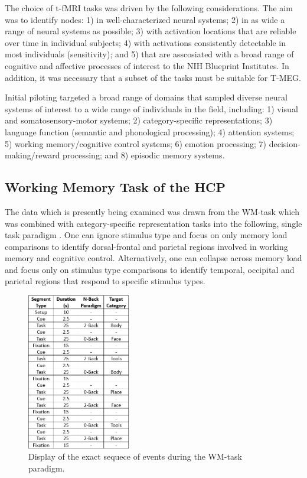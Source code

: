 The choice of \gls{t-fMRI} tasks was driven by the following considerations. The aim was to identify nodes: 1) in well-characterized neural systems; 2) in as wide a range of neural systems as possible; 3) with activation locations that are reliable over time in individual subjects; 4) with activations consistently detectable in most individuals (sensitivity); and 5) that are asscosiated with a broad range of cognitive and affective processes of interest to the \gls{NIH} Blueprint Institutes. In addition, it was necessary that a subset of the tasks must be suitable for \gls{T-MEG}.

Initial piloting targeted a broad range of domains that sampled diverse neural systems of interest to a wide range of individuals in the field, including: 1) visual and somatosensory-motor systems; 2) category-specific representations; 3) language function (semantic and phonological processing); 4) attention systems; 5) working memory/cognitive control systems; 6) emotion processing; 7) decision-making/reward processing; and 8) episodic memory systems.

\subsection{Working Memory Task of the HCP}

The data which is presently being examined was drawn from the \gls{WM}-task which was combined with category-specific representation tasks into the following, single task paradigm \cite{HCP_Task}. One can ignore stimulus type and focus on only memory load comparisons to identify dorsal-frontal and parietal regions involved in working memory and cognitive control. Alternatively, one can collapse across memory load and focus only on stimulus type comparisons to identify temporal, occipital and parietal regions that respond to specific stimulus types.

\begin{figure}
    \centering
    \includegraphics[width = 0.4\textwidth]{assets/images/WM_mat.png}
    \caption{Display of the exact sequece of events during the \gls{WM}-task paradigm.}
    \label{fig:WM_mat}
\end{figure}


